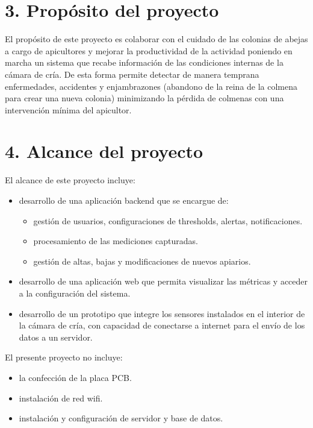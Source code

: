 \documentclass[
11pt, %
codirector, %
]{charter}
\begin{document}
\section{3. Propósito del proyecto}
\label{sec:proposito}

El propósito de este proyecto es colaborar con el cuidado de las colonias de abejas a cargo de apicultores y mejorar la productividad de la actividad poniendo en marcha un sistema que recabe información de las condiciones internas de la cámara de cría. De esta forma permite detectar de manera temprana enfermedades, accidentes y enjambrazones (abandono de la reina de la colmena para crear una nueva colonia)  minimizando la pérdida de colmenas con una intervención mínima del apicultor.

\section{4. Alcance del proyecto}
\label{sec:alcance}

El alcance de este proyecto incluye: 
\begin{itemize}
\item desarrollo de una aplicación backend que se encargue de:
	\begin{itemize}
	\item gestión de usuarios, configuraciones de thresholds, alertas, notificaciones.
	\item procesamiento de las mediciones capturadas.
	\item gestión de altas, bajas y modificaciones de nuevos apiarios.
	\end{itemize}
\item desarrollo de una aplicación web que permita visualizar las métricas y acceder a la configuración del sistema.
\item desarrollo de un prototipo que integre los sensores instalados en el interior de la cámara de cría, con capacidad de conectarse a internet para el envío de los datos a un servidor.
\end{itemize}

El presente proyecto no incluye:

\begin{itemize}
\item la confección de la placa PCB.
\item instalación de red wifi.
\item instalación y configuración de servidor y base de datos.
\end{itemize}
\end{document}
